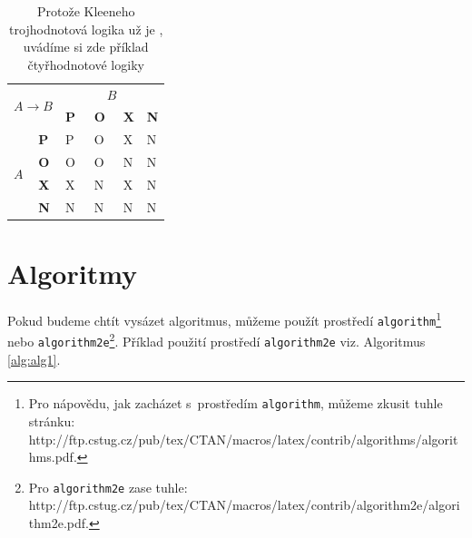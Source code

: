 \documentclass[11pt,titlepage,a4paper]{article}
\begin{document}
\begin{table}[ht]
\begin{tabular}{|l|l|l|l|l|l|} 
\hline
\multicolumn{2}{|l|}{\multirow{2}{*}{$A \rightarrow B$}}     & \multicolumn{4}{c|}{$B$}              \\ 
\cline{3-3}\cline{4-4}\cline{5-5}\cline{6-6}
\multicolumn{2}{|l|}{} & \textbf{P} & \textbf{O} & \textbf{X} & \textbf{N} \\ 
\hline
\multirow{4}{*}{$A$}                       & \textbf{P} & P                      & O~& X & N  \\ 
\cline{2-6}
                                           & \textbf{O} & O~& O~& N & N  \\ 
\cline{2-6}
                                           & \textbf{X} & X                      & N & X & N  \\ 
\cline{2-6}
                                           & \textbf{N} & N                      & N & N & N  \\
\hline
\end{tabular}

\caption{Protože Kleeneho trojhodnotová logika už je , uvádíme si zde příklad čtyřhodnotové logiky}
\label{tab2}
\end{table}

\pagebreak

\section{Algoritmy} \label{sekce-algoritmy}

Pokud budeme chtít vysázet algoritmus, můžeme použít prostředí \texttt{algorithm}\footnote{Pro nápovědu, jak zacházet s~prostředím \texttt{algorithm}, můžeme zkusit tuhle stránku: http://ftp.cstug.cz/pub/tex/CTAN/macros/latex/contrib/algorithms/algorithms.pdf.} nebo \texttt{algorithm2e}\footnote{Pro \texttt{algorithm2e} zase tuhle: http://ftp.cstug.cz/pub/tex/CTAN/macros/latex/contrib/algorithm2e/algorithm2e.pdf.}.
Příklad použití prostředí \texttt{algorithm2e} viz. Algoritmus \ref{alg:alg1}.
\end{document}
